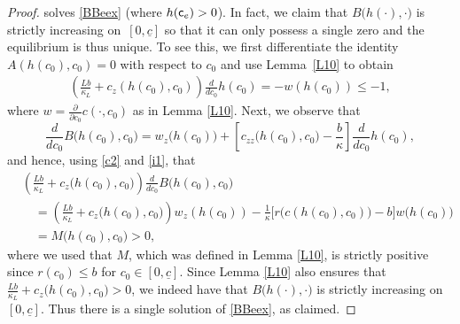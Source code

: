 \documentclass[10pt,a4paper]{amsart}
\begin{document}
\begin{proof}
  solves \eqref{BBeex} (where $h({\sf c}_e)>0$). In fact, we claim that
  $B\bigl( h(\cdot),\cdot\bigr)$ is strictly increasing
  on~$[0,\underline{c}]$ so that it can only possess a single zero and 
  the equilibrium is thus unique. To see this, we first differentiate
  the identity $A(h(c_0),c_0)=0$ with respect to $c_0$ and use
  Lemma~\ref{L10} to obtain 
\begin{align}\label{i1}
\left(\frac{Lb}{\kappa_L}+ c_z(h(c_0),c_0)\right)\frac{d}{d c_0}h(c_0)=-w(h(c_0))\le -1,
\end{align}
where $w=\frac{\partial}{\partial{c_0}} c(\cdot,c_0)$ as in Lemma \eqref{L10}. Next,
  we observe that
  \begin{equation*}
    \frac{d}{d c_0}  B\bigl( h(c_0), c_0\bigr)=w_z\bigl(
    h(c_0)\bigr)+\left[ c_{zz}\bigl(h(c_0),c_0\bigr)-\frac{b}{\kappa}\right]
    \frac{d}{dc_0}h(c_0),
  \end{equation*}
  and hence, using \eqref{c2} and \eqref{i1}, that
  \begin{align*}
    &\left(\frac{Lb}{\kappa_L}+c_z\bigl( h(c_0),c_0\bigr)\right)
    \frac{d}{dc_0}  B\bigl( h(c_0),c_0\bigr) \\
    &\quad =\left(\frac{Lb}{\kappa_L}+c_z\bigl(
      h(c_0),c_0\bigr)\right)
    w_z(h(c_0))-\frac{1}{\kappa}\bigl[r\bigl(c(h(c_0),c_0)\bigr)-b\bigr]
    w\bigl( h(c_0)\bigr)\\
    &\quad=M\bigl( h(c_0),c_0\bigr)>0,
  \end{align*}
  where we used that $M$, which was defined in Lemma \ref{L10}, is
  strictly positive since $r(c_0)\le b$ for $c_0\in[0,\underline{c}]$. Since Lemma
  \ref{L10}
  also ensures that $\frac{Lb}{\kappa_L}+c_z\bigl(
  h(c_0),c_0\bigr)>0$, we indeed have that $B\bigl(
  h(\cdot),\cdot\bigr)$ is strictly increasing on
  $[0,\underline{c}]$. Thus there is a single solution of
  \eqref{BBeex}, as claimed.
\end{proof}
\end{document}
